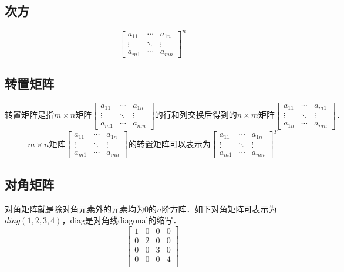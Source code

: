 \documentclass[12pt]{article}
\begin{document}
\begin{CJK}{UTF8}{gbsn}
\subsection{次方}
\begin{equation}
\left[
\begin{array}{ccc}
a_{11} & \cdots & a_{1n} \\
\vdots & \ddots & \vdots \\
a_{m1} & \cdots & a_{mn} 
\end{array}
\right]^n
\end{equation}

\subsection{转置矩阵}
\begin{equation}
\text{转置矩阵是指}m \times n\text{矩阵}
\left[
\begin{array}{ccc}
a_{11} & \cdots & a_{1n} \\
\vdots & \ddots & \vdots \\
a_{m1} & \cdots & a_{mn} 
\end{array}
\right]
\text{的行和列交换后得到的}n \times m
\text{矩阵}\left[
\begin{array}{ccc}
a_{11} & \cdots & a_{m1} \\
\vdots & \ddots & \vdots \\
a_{1n} & \cdots & a_{mn} 
\end{array}
\right]\text{．}
\end{equation}
\begin{equation}
m \times n\text{矩阵}\left[
\begin{array}{ccc}
a_{11} & \cdots & a_{1n} \\
\vdots & \ddots & \vdots \\
a_{m1} & \cdots & a_{mn} 
\end{array}
\right]\text{的转置矩阵可以表示为}\left[
\begin{array}{ccc}
a_{11} & \cdots & a_{1n} \\
\vdots & \ddots & \vdots \\
a_{m1} & \cdots & a_{mn} 
\end{array}
\right]^T
\end{equation}

\subsection{对角矩阵}
对角矩阵就是除对角元素外的元素均为$0$的$n$阶方阵．如下对角矩阵可表示为$diag(1,2,3,4)$，diag是对角线diagonal的缩写．
\begin{equation}
\left[
\begin{array}{cccc}
1 & 0 & 0 & 0 \\
0 & 2 & 0 & 0 \\
0 & 0 & 3 & 0 \\
0 & 0 & 0 & 4 \\
\end{array}
\right]
\end{equation}


\end{CJK}
\end{document}
